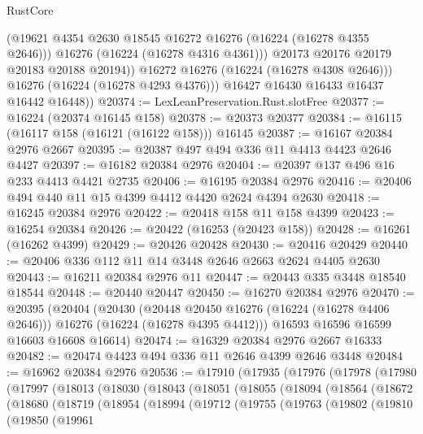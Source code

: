 \begin{lexlean}{RustCore}
\begin{coremodule}
                  (@19621 @4354 @2630 @18545 @16272 @16276 (@16224 (@16278 @4355 @2646)))
                  @16276
                  (@16224 (@16278 @4316 @4361)))
                @20173
                @20176
                @20179
                @20183
                @20188
                @20194))
            @16272
            @16276
            (@16224 (@16278 @4308 @2646)))
          @16276
          (@16224 (@16278 @4293 @4376)))
        @16427
        @16430
        @16433
        @16437
        @16442
        @16448))
@20374 := LexLeanPreservation.Rust.slotFree
@20377 := @16224 (@20374 @16145 @158)
@20378 := @20373 @20377
@20384 := @16115 (@16117 @158 (@16121 (@16122 @158))) @16145
@20387 := @16167 @20384 @2976 @2667
@20395 := @20387 @497 @494 @336 @11 @4413 @4423 @2646 @4427
@20397 := @16182 @20384 @2976
@20404 := @20397 @137 @496 @16 @233 @4413 @4421 @2735
@20406 := @16195 @20384 @2976
@20416 := @20406 @494 @440 @11 @15 @4399 @4412 @4420 @2624 @4394 @2630
@20418 := @16245 @20384 @2976
@20422 := @20418 @158 @11 @158 @4399
@20423 := @16254 @20384
@20426 := @20422 (@16253 (@20423 @158))
@20428 := @16261 (@16262 @4399)
@20429 := @20426 @20428
@20430 := @20416 @20429
@20440 := @20406 @336 @112 @11 @14 @3448 @2646 @2663 @2624 @4405 @2630
@20443 := @16211 @20384 @2976 @11
@20447 := @20443 @335 @3448 @18540 @18544
@20448 := @20440 @20447
@20450 := @16270 @20384 @2976
@20470 := @20395
    (@20404
      (@20430
        (@20448 @20450 @16276 (@16224 (@16278 @4406 @2646)))
        @16276
        (@16224 (@16278 @4395 @4412)))
      @16593
      @16596
      @16599
      @16603
      @16608
      @16614)
@20474 := @16329 @20384 @2976 @2667 @16333
@20482 := @20474 @4423 @494 @336 @11 @2646 @4399 @2646 @3448
@20484 := @16962 @20384 @2976
@20536 := @17910
    (@17935
      (@17976
        (@17978
          (@17980
            (@17997
              (@18013
                (@18030
                  (@18043
                    (@18051
                      (@18055
                        (@18094
                          (@18564
                            (@18672
                              (@18680
                                (@18719
                                  (@18954
                                    (@18994
                                      (@19712
                                        (@19755
                                          (@19763
                                            (@19802
                                              (@19810
                                                (@19850
                                                  (@19961

\end{coremodule}
\end{lexlean}
